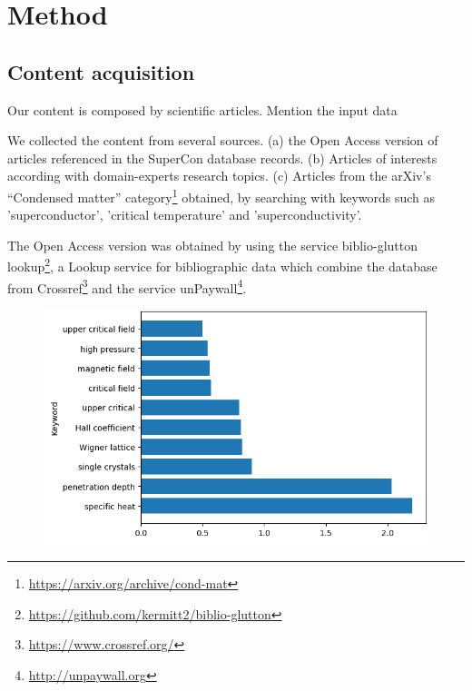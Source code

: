 \documentclass[a4paper,10pt]{article}
\begin{document}

\label{sec:method}
\section{Method}
\subsection{Content acquisition}
Our content is composed by scientific articles. Mention the input data 

We collected the content from several sources. (a) the Open Access version of articles referenced in the SuperCon database records. (b) Articles of interests according with domain-experts research topics. (c) Articles from the arXiv's “Condensed matter” category\footnote{\url{https://arxiv.org/archive/cond-mat}} obtained, by searching with keywords such as 'superconductor', 'critical temperature' and 'superconductivity'.

The Open Access version was obtained by using the service biblio-glutton lookup\footnote{\url{https://github.com/kermitt2/biblio-glutton}}, a Lookup service for bibliographic data which combine the database from Crossref\footnote{\url{https://www.crossref.org/}} and the service unPaywall\footnote{\url{http://unpaywall.org}}. 

\begin{figure}[h]
    \centering
    \includegraphics[width=\linewidth]{keyword-top10-body-distribution}
    \label{fig:keyword-top10-body}
\end{figure}
\end{document}
